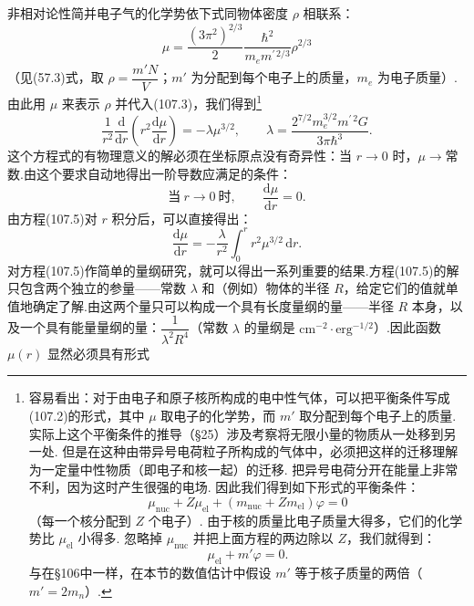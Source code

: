 非相对论性简并电子气的化学势依下式同物体密度 $\rho$ 相联系：
\begin{equation}
  \mu=\frac{(3\pi^2)^{2/3}}{2}
  \frac{\hbar^2}{m_em^{\prime\,2/3}}\rho^{2/3}
\end{equation}
（见(57.3)式，取 $\rho=\dfrac{m'N}{V}$；$m'$ 为分配到每个电子上的质量，$m_e$ 为电子质量）.由此用 $\mu$ 来表示 $\rho$ 并代入(107.3)，我们得到\footnote{容易看出：对于由电子和原子核所构成的电中性气体，可以把平衡条件写成(107.2)的形式，其中 $\mu$ 取电子的化学势，而 $m'$ 取分配到每个电子上的质量. 实际上这个平衡条件的推导（§25）涉及考察将无限小量的物质从一处移到另一处. 但是在这种由带异号电荷粒子所构成的气体中，必须把这样的迁移理解为一定量中性物质（即电子和核一起）的迁移. 把异号电荷分开在能量上非常不利，因为这时产生很强的电场. 因此我们得到如下形式的平衡条件：
\begin{equation*}
  \mu_{\mathrm{nuc}}+Z\mu_{\mathrm{el}}
  +(m_{\mathrm{nuc}}+Zm_{\mathrm{el}})\varphi=0
\end{equation*}
（每一个核分配到 $Z$ 个电子）. 由于核的质量比电子质量大得多，它们的化学势比 $\mu_{\mathrm{el}}$ 小得多. 忽略掉 $\mu_{\mathrm{nuc}}$ 并把上面方程的两边除以 $Z$，我们就得到：
\begin{equation*}
  \mu_{\mathrm{el}}+m'\varphi=0.
\end{equation*}
与在§106中一样，在本节的数值估计中假设 $m'$ 等于核子质量的两倍（$m'=2m_n$）.}
\begin{equation}
  \frac{1}{r^2}\frac{\mathrm{d}}{\mathrm{d}r}
  \left(r^2\frac{\mathrm{d}\mu}{\mathrm{d}r}\right)=-\lambda\mu^{3/2},
  \qquad\lambda=\frac{2^{7/2}m_e^{3/2}m^{\prime\,2}G}{3\pi\hbar^3}.
\end{equation}
这个方程式的有物理意义的解必须在坐标原点没有奇异性：当 $r\to0$ 时，$\mu\to$常数.由这个要求自动地得出一阶导数应满足的条件：
\begin{equation}
  \text{当}\ r\to0\ \text{时},\qquad\frac{\mathrm{d}\mu}{\mathrm{d}r}=0.
\end{equation}
由方程(107.5)对 $r$ 积分后，可以直接得出：
\begin{equation*}
  \frac{\mathrm{d}\mu}{\mathrm{d}r}
  =-\frac{\lambda}{r^2}\int_0^r r^2\mu^{3/2}\,\mathrm{d}r.
\end{equation*}
对方程(107.5)作简单的量纲研究，就可以得出一系列重要的结果.方程(107.5)的解只包含两个独立的参量——常数 $\lambda$ 和（例如）物体的半径 $R$，给定它们的值就单值地确定了解.由这两个量只可以构成一个具有长度量纲的量——半径 $R$ 本身，以及一个具有能量量纲的量：$\dfrac{1}{\lambda^2R^4}$（常数 $\lambda$ 的量纲是 $\mathrm{cm^{-2}\cdot erg^{-1/2}}$）.因此函数 $\mu(r)$ 显然必须具有形式
